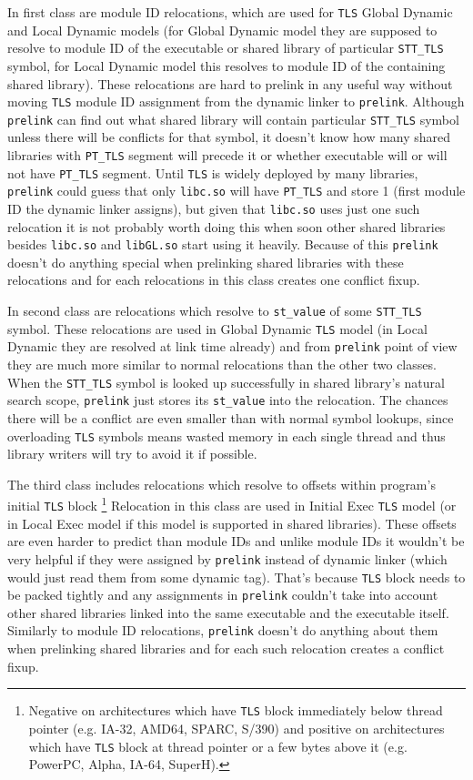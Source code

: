 \documentclass[twoside]{article}
\def\tts#1{\texttt{\small #1}}
\begin{document}
In first class are module ID relocations, which are used for \tts{TLS}
Global Dynamic and Local Dynamic models (for Global Dynamic model
they are supposed to resolve to module ID of the executable or shared library
of particular \tts{STT\_TLS} symbol, for Local Dynamic model this
resolves to module ID of the containing shared library).  These
relocations are hard to prelink in any useful way without moving
\tts{TLS} module ID assignment from the dynamic linker to \tts{prelink}.
Although \tts{prelink} can find out what shared library will contain
particular \tts{STT\_TLS} symbol unless there will be conflicts
for that symbol, it doesn't know how many shared libraries with
\tts{PT\_TLS} segment will precede it or whether executable will or
will not have \tts{PT\_TLS} segment.  Until \tts{TLS} is widely
deployed by many libraries, \tts{prelink} could guess that
only \tts{libc.so} will have \tts{PT\_TLS} and store 1 (first module ID
the dynamic linker assigns), but given that \tts{libc.so} uses just
one such relocation it is not probably worth doing this when soon other
shared libraries besides \tts{libc.so} and \tts{libGL.so} start using
it heavily.  Because of this \tts{prelink} doesn't do anything special
when prelinking shared libraries with these relocations and for each
relocations in this class creates one conflict fixup.

In second class are relocations which resolve to \tts{st\_value}
of some \tts{STT\_TLS} symbol.  These relocations are used in
Global Dynamic \tts{TLS} model (in Local Dynamic they are resolved
at link time already) and from \tts{prelink} point of view they are
much more similar to normal relocations than the other two classes.
When the \tts{STT\_TLS} symbol is looked up successfully in shared library's
natural search scope, \tts{prelink} just stores its \tts{st\_value}
into the relocation.  The chances there will be a conflict are even
smaller than with normal symbol lookups, since overloading \tts{TLS}
symbols means wasted memory in each single thread and thus library
writers will try to avoid it if possible.

The third class includes relocations which resolve to offsets within
program's initial \tts{TLS} block
\footnote{Negative on architectures which have
\tts{TLS} block immediately below thread pointer (e.g. IA-32, AMD64,
SPARC, S/390) and positive on architectures which have \tts{TLS} block
at thread pointer or a few bytes above it (e.g. PowerPC, Alpha, IA-64,
SuperH).}
Relocation in this class are used in Initial Exec \tts{TLS} model
(or in Local Exec model if this model is supported in shared libraries).
These offsets are even harder to predict than module IDs and unlike
module IDs it wouldn't be very helpful if they were assigned by
\tts{prelink} instead of dynamic linker (which would just read them
from some dynamic tag).  That's because \tts{TLS} block needs to be
packed tightly and any assignments in \tts{prelink} couldn't take
into account other shared libraries linked into the same executable
and the executable itself.  Similarly to module ID relocations,
\tts{prelink} doesn't do anything about them when prelinking shared
libraries and for each such relocation creates a conflict fixup.
\end{document}
